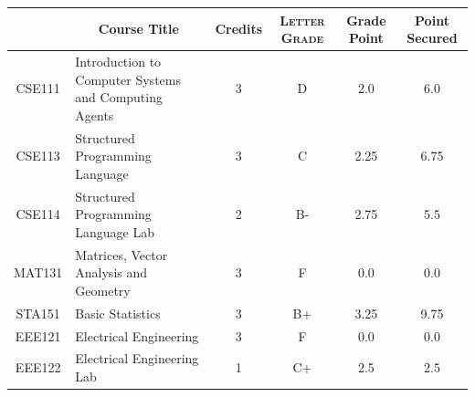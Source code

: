 \documentclass[11pt]{article}
\newcommand*{\numtwo}[1]{\pgfmathprintnumber[
                    fixed, precision=2, fixed zerofill=true]{#1}}
\begin{document}
                \begin{center}
                    \renewcommand{\arraystretch}{1.08}
                    
                \begin{tabular}{|c|l|c|>{\scshape}c|c|c|}
                \hline  \rule[-1ex]{0pt}{3.5ex} {\centering{\bf Course Code}} &  \multicolumn{1}{c|}{\textbf{Course Title}}  & {\bf Credits} & {\bf Letter Grade} & {\bf Grade Point} & {\bf Point Secured}  \\ 
                \hline   CSE111 &  Introduction to Computer Systems and Computing Agents		 & 3 & D & 2.0 & 6.0 \\ %
                \hline   CSE113 &  Structured Programming Language		 & 3 & C & 2.25 & 6.75 \\ %
                \hline   CSE114 &  Structured Programming Language Lab		 & 2 & B- & 2.75 & 5.5 \\ %
                \hline   MAT131 &  Matrices, Vector Analysis and Geometry		 & 3 & F & 0.0 & 0.0 \\ %
                \hline   STA151 &  Basic Statistics		 & 3 & B+ & 3.25 & 9.75 \\ %
                \hline   EEE121 &  Electrical Engineering		 & 3 & F & 0.0 & 0.0 \\ %
                \hline   EEE122 &  Electrical Engineering Lab		 & 1 & C+ & 2.5 & 2.5 \\ %

\hline                %
                \end{tabular}
                \end{center}
                \renewcommand{\arraystretch}{1.03}
\end{document}
